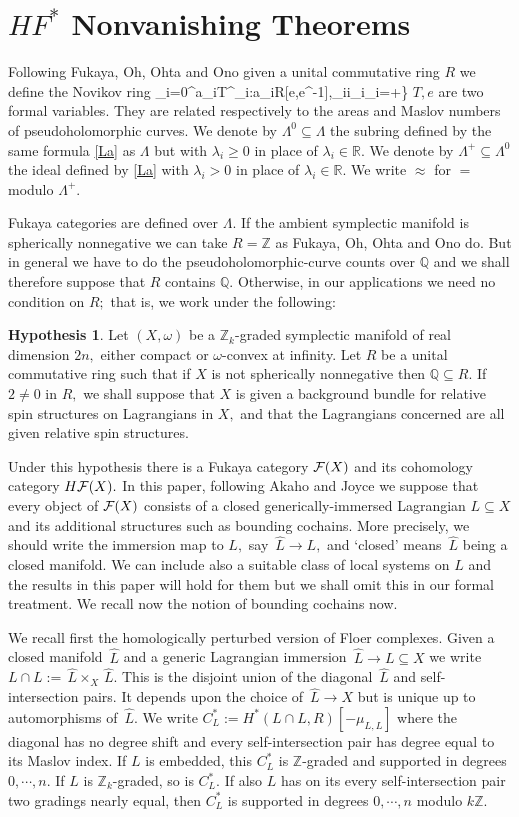 \documentclass{article}
\theoremstyle{plain}%
\theoremstyle{definition}
\newtheorem{hp}[thm]{Hypothesis}
\numberwithin{equation}{section}
\numberwithin{figure}{section}
\def\e#1\e{\begin{equation}#1\end{equation}}
\def\eq{\eqref}
\def\l{\label}
\def\Lh{\,\widehat{\!L}}
\def\px{\approx}
\def\ge{\geqslant}
\def\cF{{\mathbin{\cal F}}}
\def\Q{{\mathbin{\mathbb Q}}}
\def\R{{\mathbin{\mathbb R}}}
\def\Z{{\mathbin{\mathbb Z}}}
\def\la{\lambda}
\def\om{\omega}
\def\La{\Lambda}
\def\iy{\infty}
\def\t{\times}
\def\sb{\subseteq}
\begin{document}
\section{$HF^*$ Nonvanishing Theorems}\l{sec3}
Following Fukaya, Oh, Ohta and Ono \cite{FOOO} given a unital commutative ring $R$ we define the Novikov ring
\e\l{La}\La=\left\{\sum_{i=0}^\iy a_iT^{\la_i}:a_i\in R[e,e^{-1}],\la_i\in\R{}i\lim_{i\to\iy}\la_i=+\iy\right\}\e
where $T,e$ are two formal variables. They are related respectively to the areas and Maslov numbers of pseudoholomorphic curves.
We denote by $\La^0\sb\La$ the subring defined by the same formula \eq{La} as $\La$
but with $\la_i\ge0$ in place of $\la_i\in\R.$
We denote by $\La^+\sb\La^0$ the ideal defined by \eq{La} with $\la_i>0$ in place of $\la_i\in\R.$
We write $\px$ for $=$ modulo $\La^+.$

Fukaya categories are defined over $\La.$
If the ambient symplectic manifold is spherically nonnegative we can take $R=\Z$ as Fukaya, Oh, Ohta and Ono \cite{FOOO-Z} do.
But in general we have to do the pseudoholomorphic-curve counts over $\Q$ and we shall therefore suppose that $R$ contains $\Q.$
Otherwise, in our applications we need no condition on $R;$ that is, we work under the following:
\begin{hp}\l{0}
Let $(X,\om)$ be a $\Z_k$-graded symplectic manifold of real dimension $2n,$
either compact or $\om$-convex at infinity.
Let $R$ be a unital commutative ring such that if $X$ is not spherically nonnegative then $\Q\sb R.$
If $2\ne0$ in $R,$ we shall suppose that $X$ is given a background bundle for relative spin structures on Lagrangians in $X,$
and that the Lagrangians concerned are all given relative spin structures.
\end{hp}
Under this hypothesis there is a Fukaya category $\cF(X)$ and its cohomology category $H\cF(X).$
In this paper, following Akaho and Joyce \cite{AJ} we suppose that every object of $\cF(X)$ consists of
a closed generically-immersed Lagrangian $L\sb X$ and its additional structures such as bounding cochains.
More precisely, we should write the immersion map to $L,$ say $\Lh\to L,$ and `closed' means $\Lh$ being a  closed manifold.
We can include also a suitable class of local systems on $L$ and the results in this paper will hold for them but we shall omit this in our formal treatment.
We recall now the notion of bounding cochains now.

We recall first the homologically perturbed version of Floer complexes.
Given a closed manifold $\Lh$ and a generic Lagrangian immersion $\Lh\to L\sb X$ we write $L\cap L:=\Lh\t_X\Lh.$
This is the disjoint union of the diagonal $\Lh$ and self-intersection pairs.
It depends upon the choice of $\Lh\to X$ but is unique up to automorphisms of $\Lh.$
We write
$C_L^*:=H^*(L\cap L,R)[-\mu_{L,L}]$
where the diagonal has no degree shift and every self-intersection pair has degree equal to its Maslov index.
If $L$ is embedded, this $C_L^*$ is $\Z$-graded and supported in degrees $0,\cdots,n.$
If $L$ is $\Z_k$-graded, so is $C_L^*.$
If also $L$ has on its every self-intersection pair two gradings nearly equal,
then $C_L^*$ is supported in degrees $0,\cdots,n$ modulo $k\Z.$
\end{document}
